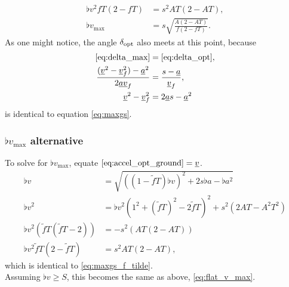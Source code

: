 \begin{align*}
\flat{v}^2 fT(2 - fT) &= s^2 AT(2 - AT),\\
\flat{v}_{\max} &= s \sqrt{\frac{A(2 - AT)}{f(2 - fT)}}.
\end{align*}
As one might notice, the angle $\delta_{\operatorname{opt}}$ also meets at this point, because
\begin{align*}
\eqref{eq:delta_max} &= \eqref{eq:delta_opt},\\
\frac{(\flat{v}^2 - \flat{v}_f^2) - \flat{a}^2}{2 \flat{a} \flat{v}_f} &= \frac{s - \flat{a}}{\flat{v}_f},\\
\flat{v}^2 - \flat{v}_f^2 &= 2 \flat{a} s - \flat{a}^2
\end{align*}
is identical to equation \eqref{eq:maxgs}.


\subsubsection{\texorpdfstring{$\flat{v}_{\max}$ alternative}{flat v\_max alternative}}
\label{app:derive_flat_v_max_alternative}
To solve for $\flat{v}_{\max}$, equate $\eqref{eq:accel_opt_ground} = \flat{v}$.
\begin{align*}
\flat{v} &= \sqrt{\left((1 - \tilde{f}T)\flat{v} \right)^2 + 2s\flat{a} - \flat{a}^2}\\
\flat{v}^2 &= \flat{v}^2\left(1^2 + (\tilde{f}T)^2 - 2\tilde{f}T \right)^2 + s^2(2AT - A^2T^2)\\
\flat{v}^2(\tilde{f}T(\tilde{f}T - 2)) &= -s^2(AT(2 - AT))\\
\flat{v}^2\tilde{f}T(2 - \tilde{f}T) &= s^2AT(2 - AT),
\end{align*}
which is identical to \eqref{eq:maxgs_f_tilde}.\\
Assuming $\flat{v} \ge S$, this becomes the same as above, \eqref{eq:flat_v_max}.



